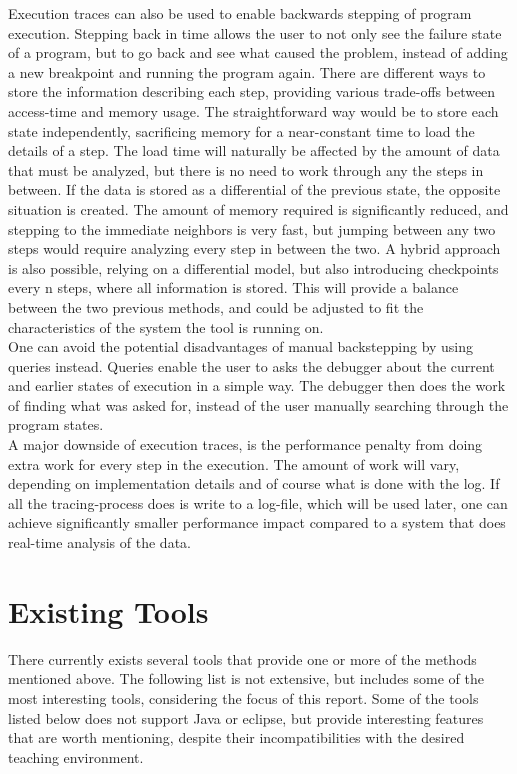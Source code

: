 Execution traces can also be used to enable backwards stepping of program execution.
Stepping back in time allows the user to not only see the failure state of a program, but to go back and see what caused the problem, instead of adding a new \gls{breakpoint} and running the program again.
There are different ways to store the information describing each step, providing various trade-offs between access-time and memory usage.
The straightforward way would be to store each state independently, sacrificing memory for a near-constant time to load the details of a step.
The load time will naturally be affected by the amount of data that must be analyzed, but there is no need to work through any the steps in between.
If the data is stored as a differential of the previous state, the opposite situation is created.
The amount of memory required is significantly reduced, and stepping to the immediate neighbors is very fast, but jumping between any two steps would require analyzing every step in between the two.
A hybrid approach is also possible, relying on a differential model, but also introducing checkpoints every n steps, where all information is stored.
This will provide a balance between the two previous methods, and could be adjusted to fit the characteristics of the system the tool is running on.
~\\

One can avoid the potential disadvantages of manual backstepping by using queries instead.
Queries enable the user to asks the debugger about the current and earlier states of execution in a simple way.
The debugger then does the work of finding what was asked for, instead of the user manually searching through the program states.
~\\

A major downside of execution traces, is the performance penalty from doing extra work for every step in the execution.
The amount of work will vary, depending on implementation details and of course what is done with the log.
If all the tracing-process does is write to a log-file, which will be used later, one can achieve significantly smaller performance impact compared to a system that does real-time analysis of the data.
~\\

\section{Existing Tools}\label{PreTools}
There currently exists several tools that provide one or more of the methods mentioned above.
The following list is not extensive, but includes some of the most interesting tools, considering the focus of this report.
Some of the tools listed below does not support Java or eclipse, but provide interesting features that are worth mentioning, despite their incompatibilities with the desired teaching environment.
~\\


